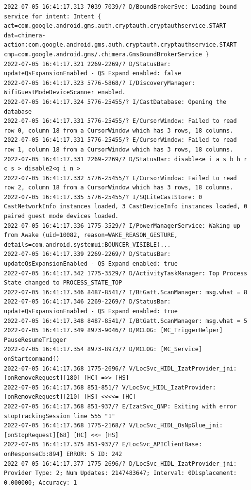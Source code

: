 \documentclass[a4paper,12pt]{book}
\begin{document}
\begin{lstlisting}
2022-07-05 16:41:17.313 7039-7039/? D/BoundBrokerSvc: Loading bound service for intent: Intent { act=com.google.android.gms.auth.cryptauth.cryptauthservice.START dat=chimera-action:com.google.android.gms.auth.cryptauth.cryptauthservice.START cmp=com.google.android.gms/.chimera.GmsBoundBrokerService }
2022-07-05 16:41:17.321 2269-2269/? D/StatusBar: updateQsExpansionEnabled - QS Expand enabled: false
2022-07-05 16:41:17.323 5776-5868/? I/DiscoveryManager: WifiGuestModeDeviceScanner enabled.
2022-07-05 16:41:17.324 5776-25455/? I/CastDatabase: Opening the database
2022-07-05 16:41:17.331 5776-25455/? E/CursorWindow: Failed to read row 0, column 18 from a CursorWindow which has 3 rows, 18 columns.
2022-07-05 16:41:17.331 5776-25455/? E/CursorWindow: Failed to read row 1, column 18 from a CursorWindow which has 3 rows, 18 columns.
2022-07-05 16:41:17.331 2269-2269/? D/StatusBar: disable<e i a s b h r c s > disable2<q i n >
2022-07-05 16:41:17.332 5776-25455/? E/CursorWindow: Failed to read row 2, column 18 from a CursorWindow which has 3 rows, 18 columns.
2022-07-05 16:41:17.335 5776-25455/? I/SQLiteCastStore: 0 CastNetworkInfo instances loaded, 3 CastDeviceInfo instances loaded, 0 paired guest mode devices loaded.
2022-07-05 16:41:17.336 1775-3529/? I/PowerManagerService: Waking up from Awake (uid=10082, reason=WAKE_REASON_GESTURE, details=com.android.systemui:BOUNCER_VISIBLE)...
2022-07-05 16:41:17.339 2269-2269/? D/StatusBar: updateQsExpansionEnabled - QS Expand enabled: true
2022-07-05 16:41:17.342 1775-3529/? D/ActivityTaskManager: Top Process State changed to PROCESS_STATE_TOP
2022-07-05 16:41:17.346 8487-8541/? I/BtGatt.ScanManager: msg.what = 8
2022-07-05 16:41:17.346 2269-2269/? D/StatusBar: updateQsExpansionEnabled - QS Expand enabled: true
2022-07-05 16:41:17.348 8487-8541/? I/BtGatt.ScanManager: msg.what = 5
2022-07-05 16:41:17.349 8973-9046/? D/MCLOG: [MC_TriggerHelper] PauseResumeTrigger
2022-07-05 16:41:17.354 8973-8973/? D/MCLOG: [MC_Service] onStartcommand()
2022-07-05 16:41:17.368 1775-2696/? V/LocSvc_HIDL_IzatProvider_jni: [onRemoveRequest][180] [HC] =>> [HS]
2022-07-05 16:41:17.368 851-851/? V/LocSvc_HIDL_IzatProvider: [onRemoveRequest][210] [HS] <<<<= [HC]
2022-07-05 16:41:17.368 851-937/? E/IzatSvc_QNP: Exiting with error stopTrackingSession line 555 "1"
2022-07-05 16:41:17.368 1775-2168/? V/LocSvc_HIDL_OsNpGlue_jni: [onStopRequest][68] [HC] <<= [HS]
2022-07-05 16:41:17.375 851-937/? E/LocSvc_APIClientBase: onResponseCb:894] ERROR: 5 ID: 242
2022-07-05 16:41:17.377 1775-2696/? D/LocSvc_HIDL_IzatProvider_jni: Provider Type: 2; Num Updates: 2147483647; Interval: 0Displacement: 0.000000; Accuracy: 1

\end{lstlisting}
\end{document}

